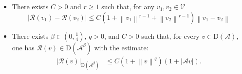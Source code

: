 \documentclass[11pt, reqno]{amsart}
\theoremstyle{definition}
\numberwithin{equation}{section}
\newcommand{\norm}[1]{\left\|{#1}\right\|}
\newcommand{\abs}[1]{\left|{#1}\right|}
\begin{document}
\begin{itemize}
	\item[(R3)] There exists $C>0$ and $r\geq 1$ such that, for any {$v_1,v_2\in\mathcal{V}$}
	\begin{equation}\label{equ:est Rv1 minus v2}
        \abs{\mathcal{R}(v_1)-\mathcal{R}(v_2)} \le C\left(1+\norm{v_1}^{r-1}+\norm{v_2}^{r-1}\right) \norm{v_1-v_2}
	\end{equation}
	\item[(R4)] There exists $\beta\in (0,\frac14)$, $q>0$, and $C>0$ such that, for every $v\in \mathrm{D}(\mathcal{A})$, one has $\mathcal{R}(v)\in \mathrm{D}(\mathcal{A}^{\beta})$ with the estimate:
	\begin{align}\label{equ:est R vv}
        \abs{\mathcal{R}(v)}_{\mathrm{D}(\mathcal{A}^\beta)}
		&\leq
		C \left(1+ \norm{v}^q \right) \left(1+\abs{\mathcal{A}v}\right).
	\end{align}
\end{itemize}
\end{document}
